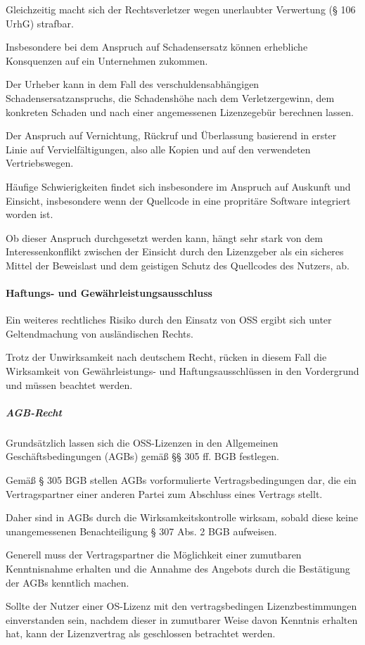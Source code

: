 Gleichzeitig macht sich der Rechtsverletzer wegen unerlaubter Verwertung (§ 106 UrhG) strafbar.

Insbesondere bei dem Anspruch auf Schadensersatz können erhebliche Konsquenzen auf ein Unternehmen zukommen. 

Der Urheber kann in dem Fall des verschuldensabhängigen Schadensersatzanspruchs, die Schadenshöhe nach dem Verletzergewinn, dem konkreten Schaden und nach einer angemessenen Lizenzegebür berechnen lassen. 

Der Anspruch auf Vernichtung, Rückruf und Überlassung basierend in erster Linie auf Vervielfältigungen, also alle Kopien und auf den verwendeten Vertriebswegen. 

Häufige Schwierigkeiten findet sich insbesondere im Anspruch auf Auskunft und Einsicht, insbesondere wenn der Quellcode in eine propritäre Software integriert worden ist. 

Ob dieser Anspruch durchgesetzt werden kann, hängt sehr stark von dem Interessenkonflikt zwischen der Einsicht durch den Lizenzgeber als ein sicheres Mittel der Beweislast und dem geistigen Schutz des Quellcodes des Nutzers, ab.

\paragraph{Haftungs- und Gewährleistungsausschluss}
Ein weiteres rechtliches Risiko durch den Einsatz von OSS ergibt sich unter Geltendmachung von ausländischen Rechts. 

Trotz der Unwirksamkeit nach deutschem Recht, rücken in diesem Fall die Wirksamkeit von Gewährleistungs- und Haftungsausschlüssen in den Vordergrund und müssen beachtet werden. 

\subparagraph{AGB-Recht}
Grundsätzlich lassen sich die OSS-Lizenzen in den Allgemeinen Geschäftsbedingungen (AGBs) gemäß §§ 305 ff. BGB festlegen.

Gemäß § 305 BGB stellen AGBs vorformulierte Vertragsbedingungen dar, die ein Vertragspartner einer anderen Partei zum Abschluss eines Vertrags stellt. 

Daher sind in AGBs durch die Wirksamkeitskontrolle wirksam, sobald diese keine unangemessenen Benachteiligung § 307 Abs. 2 BGB aufweisen. 

Generell muss der Vertragspartner die Möglichkeit einer zumutbaren Kenntnisnahme erhalten und die Annahme des Angebots durch die Bestätigung der AGBs kenntlich machen. 

Sollte der Nutzer einer OS-Lizenz mit den vertragsbedingen Lizenzbestimmungen einverstanden sein, nachdem dieser in zumutbarer Weise davon Kenntnis erhalten hat, kann der Lizenzvertrag als geschlossen betrachtet werden. 


